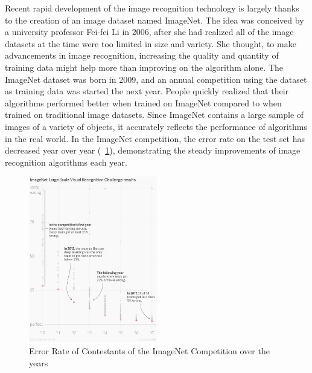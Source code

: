 \documentclass[letterpaper]{article} %
\begin{document}
Recent rapid development of the image recognition technology is largely thanks to the creation of an image dataset named ImageNet. The idea was conceived by a university professor Fei-fei Li in 2006, after she had realized all of the image datasets at the time were too limited in size and variety. She thought, to make advancements in image recognition, increasing the quality and quantity of training data might help more than improving on the algorithm alone. The ImageNet dataset was born in 2009, and an annual competition using the dataset as training data was started the next year. People quickly realized that their algorithms performed better when trained on ImageNet compared to when trained on traditional image datasets. Since ImageNet contains a large sample of images of a variety of objects, it accurately reflects the performance of algorithms in the real world. In the ImageNet competition, the error rate on the test set has decreased year over year (~\ref{fig:ErrorRate}), demonstrating the steady improvements of image recognition algorithms each year. \cite{Quartz}

\begin{figure}[h!]
 \centering
  \includegraphics[width=0.5\textwidth]{intro.png}
 \caption{Error Rate of Contestants of the ImageNet Competition over the years}
 \label{fig:ErrorRate}
 \end{figure}
\end{document}
